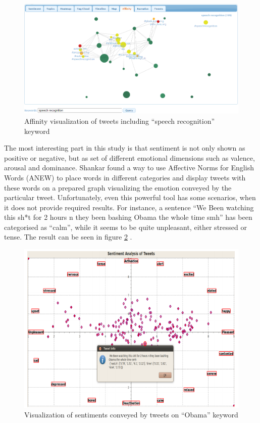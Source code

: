 \documentclass{article}
\begin{document}
\begin{figure}[H]
  \centering
  \includegraphics[scale=0.5]{img/sentimentviz2.png}
  \caption{Affinity visualization of tweets including ``speech recognition'' keyword}
  \label{fig:sentimentviz2}
\end{figure}

{\large 
The most interesting part in this study is that sentiment is not only shown as positive or negative, but as set of different emotional dimensions such as valence, arousal and dominance. Shankar found a way to use Affective Norms for English Words (ANEW) \parencite{bradley1999affective} to place words in different categories and display tweets with these words on a prepared graph visualizing the emotion conveyed by the particular tweet. Unfortunately, even this powerful tool has some scenarios, when it does not provide required results. For instance, a sentence ``We Been watching this sh*t for 2 hours n they been bashing Obama the whole time smh'' has been categorised as ``calm'', while it seems to be quite unpleasant, either stressed or tense. The result can be seen in figure \ref{fig:sentimentviz3} \parencite{shankar2011visualization}.\par
}

\begin{figure}[H]
  \centering
  \includegraphics[scale=0.80]{img/sentimentviz3.png}
  \caption{Visualization of sentiments conveyed by tweets on ``Obama'' keyword}
  \label{fig:sentimentviz3}
\end{figure}
\end{document}
